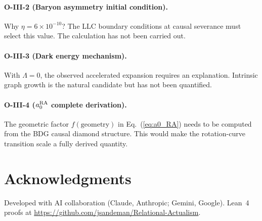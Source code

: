 \documentclass[12pt,a4paper]{article}
\begin{document}
\paragraph{O-III-2 (Baryon asymmetry initial condition).}  Why $\eta=6\times10^{-10}$?  The LLC boundary conditions at causal severance must select this value.  The calculation has not been carried out.

\paragraph{O-III-3 (Dark energy mechanism).}  With $\Lambda=0$, the observed accelerated expansion requires an explanation.  Intrinsic graph growth is the natural candidate but has not been quantified.

\paragraph{O-III-4 ($a_0^{\rm RA}$ complete derivation).}  The geometric factor $f(\text{geometry})$ in Eq.~(\ref{eq:a0_RA}) needs to be computed from the BDG causal diamond structure.  This would make the rotation-curve transition scale a fully derived quantity.

\section*{Acknowledgments}

Developed with AI collaboration (Claude, Anthropic; Gemini, Google).  Lean~4 proofs at \url{https://github.com/jsandeman/Relational-Actualism}.
\end{document}
